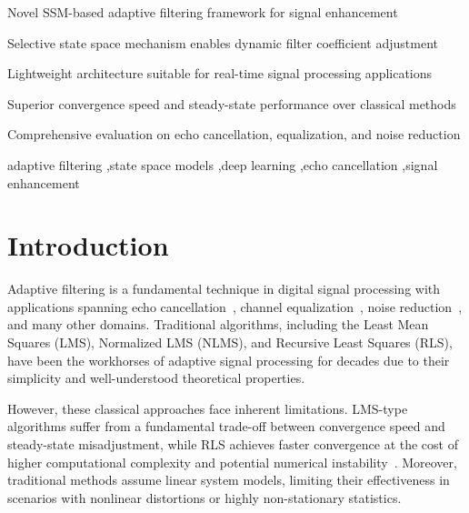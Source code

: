 \documentclass[a4paper,fleqn]{cas-sc}
\begin{document}
\begin{highlights}
\item Novel SSM-based adaptive filtering framework for signal enhancement
\item Selective state space mechanism enables dynamic filter coefficient adjustment
\item Lightweight architecture suitable for real-time signal processing applications
\item Superior convergence speed and steady-state performance over classical methods
\item Comprehensive evaluation on echo cancellation, equalization, and noise reduction
\end{highlights}

\begin{keywords}
adaptive filtering \sep state space models \sep deep learning \sep echo cancellation \sep signal enhancement
\end{keywords}

\maketitle

\section{Introduction}\label{sec:intro}


Adaptive filtering is a fundamental technique in digital signal processing with applications spanning echo cancellation~\citep{haykin2002adaptive}, channel equalization~\citep{proakis2001digital}, noise reduction~\citep{benesty2005speech}, and many other domains. Traditional algorithms, including the Least Mean Squares (LMS), Normalized LMS (NLMS), and Recursive Least Squares (RLS), have been the workhorses of adaptive signal processing for decades due to their simplicity and well-understood theoretical properties.

However, these classical approaches face inherent limitations. LMS-type algorithms suffer from a fundamental trade-off between convergence speed and steady-state misadjustment, while RLS achieves faster convergence at the cost of higher computational complexity and potential numerical instability~\citep{sayed2003fundamentals}. Moreover, traditional methods assume linear system models, limiting their effectiveness in scenarios with nonlinear distortions or highly non-stationary statistics.
\end{document}
